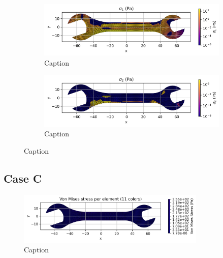     \begin{figure}[H]
        \centering
        \begin{subfigure}[t]{0.49\textwidth}
        \centering
        \includegraphics[width=\textwidth]{GRAFICOS/Case b - sigma_1_per_element.png}
        \caption{Caption}
        \label{fig:deformada_reacciones}
        \end{subfigure}
        \hfill
        \begin{subfigure}[t]{0.49\textwidth}
        \centering
        \includegraphics[width=\textwidth]{GRAFICOS/Case b - sigma_2_per_element.png}
        \caption{Caption}
        \label{fig:von_mises}
        \end{subfigure}
        \caption{Caption}
        \label{fig:analisis_estructural}
    \end{figure}

\subsection{Case C}

\begin{figure}[H]
    \centering
    \includegraphics[width=0.8\textwidth]{GRAFICOS/Case c_von_mises_per_element_11_colors.png}
    \caption{Caption}
    \label{fig:strain}
  \end{figure}

